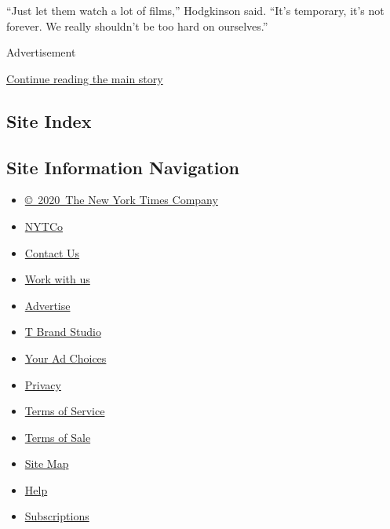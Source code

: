 ``Just let them watch a lot of films,'' Hodgkinson said. ``It's
temporary, it's not forever. We really shouldn't be too hard on
ourselves.''

Advertisement

\protect\hyperlink{after-bottom}{Continue reading the main story}

\hypertarget{site-index}{%
\subsection{Site Index}\label{site-index}}

\hypertarget{site-information-navigation}{%
\subsection{Site Information
Navigation}\label{site-information-navigation}}

\begin{itemize}
\tightlist
\item
  \href{https://help.nytimes.com/hc/en-us/articles/115014792127-Copyright-notice}{©~2020~The
  New York Times Company}
\end{itemize}

\begin{itemize}
\tightlist
\item
  \href{https://www.nytco.com/}{NYTCo}
\item
  \href{https://help.nytimes.com/hc/en-us/articles/115015385887-Contact-Us}{Contact
  Us}
\item
  \href{https://www.nytco.com/careers/}{Work with us}
\item
  \href{https://nytmediakit.com/}{Advertise}
\item
  \href{http://www.tbrandstudio.com/}{T Brand Studio}
\item
  \href{https://www.nytimes.com/privacy/cookie-policy\#how-do-i-manage-trackers}{Your
  Ad Choices}
\item
  \href{https://www.nytimes.com/privacy}{Privacy}
\item
  \href{https://help.nytimes.com/hc/en-us/articles/115014893428-Terms-of-service}{Terms
  of Service}
\item
  \href{https://help.nytimes.com/hc/en-us/articles/115014893968-Terms-of-sale}{Terms
  of Sale}
\item
  \href{https://spiderbites.nytimes.com}{Site Map}
\item
  \href{https://help.nytimes.com/hc/en-us}{Help}
\item
  \href{https://www.nytimes.com/subscription?campaignId=37WXW}{Subscriptions}
\end{itemize}
